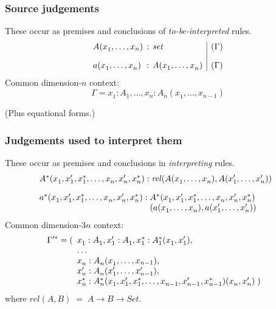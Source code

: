 \documentclass[mathserif,notitlepage]{beamer}
\begin{document}
\newcommand{\Set}{\mathit{set}}
\newcommand{\Rel}{\mathit{rel}}

\begin{frame}

\frametitle{Source judgements} 
These occur as premises and conclusions of \emph{to-be-interpreted} rules.
$$
  \begin{array}{l @{\hspace{1ex}:\hspace{1ex}}l|l}
    A(x^{}_{1},\ldots,x_n) & 
    \Set & (\Gamma )
\\[1em]
    a(x^{}_1,\ldots,x^{}_n) & A(x^{}_1,\ldots,x^{}_n) & (\Gamma) \\ 
  \end{array}
$$
Common dimension-$n$ context: 
$$  \Gamma = x^{}_1 : A^{}_1,\ldots,x^{}_n : A^{}_n (x^{}_1,\ldots,x_{n-1})
$$

(Plus equational forms.)
\end{frame}

\begin{frame}
\frametitle{Judgements used to interpret them} %
These occur as premises and conclusions in \emph{interpreting} rules.
$$
  \begin{array}{@{}l}
    A^*(x^{}_1,x'_{1},x^*_{1},\ldots,x^{}_n,x'_n,x^*_n) : \Rel(A(x^{}_1,\ldots,x^{}_n),A(x'_1,\ldots,x'_n)) 
    \\[1em] %
    a^*(x^{}_1,x'_1,x^*_1,\ldots,x^{}_n,x'_n,x^*_n) : \begin{array}[t]{@{}l}A^*(x^{}_1,x'_1,x^*_1,\ldots,x^{}_n,x'_n,x^*_n) \\
    ( a(x^{}_1,\ldots,x^{}_n)       
    , a(x'_1,\ldots,x'_n))         \end{array}
  \end{array}
$$
Common dimension-$3n$ context:
$$
\Gamma'^* =  
(\begin{array}[t]{l}
x^{}_1 : A^{}_1 , x'_1 : A^{}_1 , x^*_1:A^*_1(x^{}_1,x'_1), \\ 
\ldots \\
\begin{array}[t]{@{}l}
x^{}_n : A^{}_n  (x^{}_1,\ldots,x_{n-1}) ,   \\
x'_n : A^{}_n (x'_1,\ldots,x'_{n-1}) , \\
x^*_n : A^*_n (x^{}_1,x'_1,x^*_1,\ldots,x^{}_{n-1},x'_{n-1},x^*_{n-1})(x^{}_n,x'_n) \; ) 
\end{array}          
\end{array}          
$$
where   $ rel(A, B) \; = \; A \to B \to Set $.
\end{frame}
\end{document}

